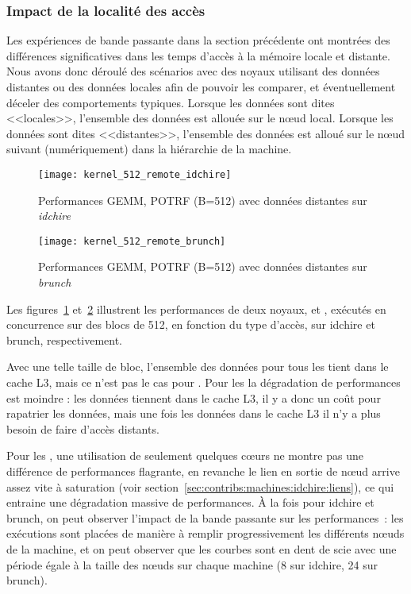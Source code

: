 \subsubsection{Impact de la localité des accès}\label{sec:contribs:apps:cholesky:locality}

Les expériences de bande passante dans la section précédente ont montrées des différences significatives dans les temps d'accès à la mémoire locale et distante.
Nous avons donc déroulé des scénarios avec des noyaux utilisant des données distantes ou des données locales afin de pouvoir les comparer, et éventuellement déceler des comportements typiques.
Lorsque les données sont dites <<locales>>, l'ensemble des données est allouée sur le nœud local. Lorsque les données sont dites <<distantes>>, l'ensemble des données est alloué sur le nœud suivant (numériquement) dans la hiérarchie de la machine.

\begin{figure}[t!]
  \centering
  \texttt{[image: kernel\_512\_remote\_idchire]}
  \caption{Performances GEMM, POTRF (B=512) avec données distantes sur \emph{idchire}}\label{fig:contribs:apps:cholesky:perf-512-remote-idchire}
\end{figure}
\begin{figure}[h!]
  \centering
  \texttt{[image: kernel\_512\_remote\_brunch]}
  \caption{Performances GEMM, POTRF (B=512) avec données distantes sur \emph{brunch}}\label{fig:contribs:apps:cholesky:perf-512-remote-brunch}
\end{figure}

Les figures~\ref{fig:contribs:apps:cholesky:perf-512-remote-idchire} et~\ref{fig:contribs:apps:cholesky:perf-512-remote-brunch} illustrent les performances de deux noyaux, \gemm et \potrf, exécutés en concurrence sur des blocs de 512, en fonction du type d'accès, sur idchire et brunch, respectivement.

Avec une telle taille de bloc, l'ensemble des données pour tous les \potrf tient dans le cache L3, mais ce n'est pas le cas pour \gemm.
Pour les \potrf la dégradation de performances est moindre : les données tiennent dans le cache L3, il y a donc un coût pour rapatrier les données, mais une fois les données dans le cache L3 il n'y a plus besoin de faire d'accès distants.

Pour les \gemm, une utilisation de seulement quelques cœurs ne montre pas une différence de performances flagrante, en revanche le lien en sortie de nœud arrive assez vite à saturation (voir section~\ref{sec:contribs:machines:idchire:liens}), ce qui entraine une dégradation massive de performances.
À la fois pour idchire et brunch, on peut observer l'impact de la bande passante sur les performances~: les exécutions sont placées de manière à remplir progressivement les différents nœuds de la machine, et on peut observer que les courbes sont en dent de scie avec une période égale à la taille des nœuds sur chaque machine (8 sur idchire, 24 sur brunch).

